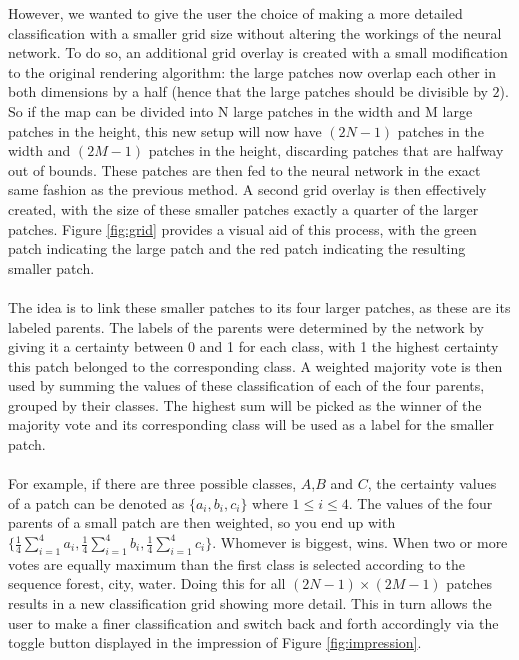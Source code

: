 \documentclass[a4paper,onecolumn]{report}
\begin{document}
However, we wanted to give the user the choice of making a more detailed classification with a smaller grid size without altering the workings of the neural network. To do so, an additional grid overlay is created with a small modification to the original rendering algorithm: the large patches now overlap each other in both dimensions by a half (hence that the large patches should be divisible by $2$). So if the map can be divided into N large patches in the width and M large patches in the height, this new setup will now have $(2N - 1)$ patches in the width and $(2M - 1)$ patches in the height, discarding patches that are halfway out of bounds. These patches are then fed to the neural network in the exact same fashion as the previous method. A second grid overlay is then effectively created, with the size of these smaller patches exactly a quarter of the larger patches. 
Figure \ref{fig:grid} provides a visual aid of this process, with the green patch indicating the large patch and the red patch indicating the resulting smaller patch.
\\\\
The idea is to link these smaller patches to its four larger patches, as these are its labeled parents. The labels of the parents were determined by the network by giving it a certainty between 0 and 1 for each class, with 1 the highest certainty this patch belonged to the corresponding class.
A weighted majority vote is then used by summing the values of these classification of each of the four parents, grouped by their classes. The highest sum will be picked as the winner of the majority vote and its corresponding class will be used as a label for the smaller patch.
\\\\
For example, if there are three possible classes, $A$,$B$ and $C$, the certainty values of a patch can be denoted as $\{a_i, b_i, c_i\}$ where $1 \leq i \leq 4$. The values of the four parents of a small patch are then weighted, so you end up with $\{ \frac{1}{4}\sum_{i=1}^{4} a_i, \frac{1}{4}\sum_{i=1}^{4} b_i, \frac{1}{4}\sum_{i=1}^{4} c_i\}$. Whomever is biggest, wins. When two or more votes are equally maximum than the first class is selected according to the sequence forest, city, water. Doing this for all $(2N - 1) \times (2M - 1)$ patches results in a new classification grid showing more detail. This in turn allows the user to make a finer classification and switch back and forth accordingly via the toggle button displayed in the impression of Figure \ref{fig:impression}. 
\end{document}
